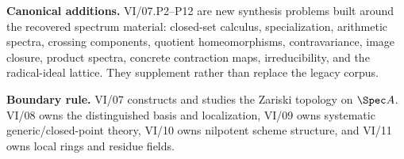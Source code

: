 \bigskip
\noindent\textbf{Canonical additions.}
VI/07.P2--P12 are new synthesis problems built around the recovered spectrum material:
closed-set calculus, specialization, arithmetic spectra, crossing components, quotient
homeomorphisms, contravariance, image closure, product spectra, concrete contraction maps,
irreducibility, and the radical-ideal lattice.  They supplement rather than replace the
legacy corpus.

\bigskip
\noindent\textbf{Boundary rule.}
VI/07 constructs and studies the Zariski topology on $\Spec A$.  VI/08 owns the distinguished
basis and localization, VI/09 owns systematic generic/closed-point theory, VI/10 owns
nilpotent scheme structure, and VI/11 owns local rings and residue fields.
